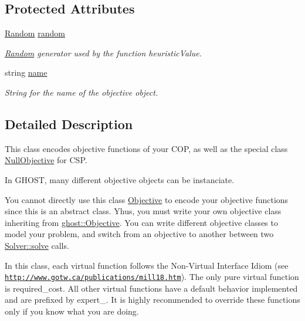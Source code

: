 \subsection*{Protected Attributes}
\begin{DoxyCompactItemize}
\item 
\hyperlink{classghost_1_1Random}{Random} \hyperlink{classghost_1_1Objective_a86081d1ebbab1fe6f781841d9ac8d546}{random}
\begin{DoxyCompactList}\small\item\em \hyperlink{classghost_1_1Random}{Random} generator used by the function heuristic\+Value. \end{DoxyCompactList}\item 
string \hyperlink{classghost_1_1Objective_af5bf0605c193884ad7f53593dabe8b85}{name}
\begin{DoxyCompactList}\small\item\em String for the name of the objective object. \end{DoxyCompactList}\end{DoxyCompactItemize}


\subsection{Detailed Description}
This class encodes objective functions of your C\+OP, as well as the special class \hyperlink{classghost_1_1NullObjective}{Null\+Objective} for C\+SP. 

In G\+H\+O\+ST, many different objective objects can be instanciate.

You cannot directly use this class \hyperlink{classghost_1_1Objective}{Objective} to encode your objective functions since this is an abstract class. Yhus, you must write your own objective class inheriting from \hyperlink{classghost_1_1Objective}{ghost\+::\+Objective}. You can write different objective classes to model your problem, and switch from an objective to another between two \hyperlink{classghost_1_1Solver_ab2f3b79560cefbe8299583a40edad40e}{Solver\+::solve} calls.

In this class, each virtual function follows the Non-\/\+Virtual Interface Idiom (see \href{http://www.gotw.ca/publications/mill18.htm}{\tt http\+://www.\+gotw.\+ca/publications/mill18.\+htm}). The only pure virtual function is required\+\_\+cost. All other virtual functions have a default behavior implemented and are prefixed by \textquotesingle{}expert\+\_\+\textquotesingle{}. It is highly recommended to override these functions only if you know what you are doing.

